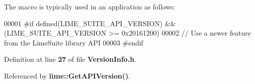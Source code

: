The macro is typically used in an application as follows\+: 
\begin{DoxyCode}
00001 #if defined(LIME\_SUITE\_API\_VERSION) && (LIME\_SUITE\_API\_VERSION >= 0x20161200)
00002 // Use a newer feature from the LimeSuite library API
00003 #endif
\end{DoxyCode}
 

Definition at line {\bf 27} of file {\bf Version\+Info.\+h}.



Referenced by {\bf lime\+::\+Get\+A\+P\+I\+Version()}.

